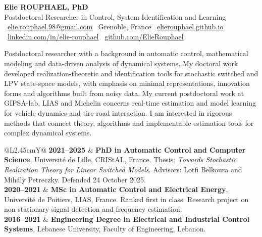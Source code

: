 \documentclass[11pt,a4paper]{article}
\newcommand{\cvsection}[1]{%
  \vspace{0.6em}%
  \noindent{\large\bfseries\color{MainBlue}#1}\par
  \vspace{0.15em}{\color{AccentBlue}\hrule height 1.1pt}%
  \vspace{0.35em}}
\newcommand{\cvitem}[2]{%
  \textbf{\color{MainBlue}#1} & #2\\}
\begin{document}
\begin{tcolorbox}[
  enhanced,
  colback=LightGray,
  colframe=LightGray,
  arc=3pt,
  boxrule=0pt,
  left=12pt,right=12pt,top=10pt,bottom=10pt,
  borderline west={3pt}{0pt}{MainBlue},
]
{\LARGE\bfseries\color{MainBlue} Elie ROUPHAEL, PhD}\\[3pt]
{\normalsize\color{DarkGray} Postdoctoral Researcher in Control, System Identification and Learning}\\[6pt]
{\footnotesize
\textcolor{AccentBlue}{}\ \href{mailto:elie.rouphael.98@gmail.com}{elie.rouphael.98@gmail.com}\quad
\textcolor{AccentBlue}{\textbullet}\ Grenoble, France\quad
\textcolor{AccentBlue}{}\ \href{https://elierouphael.github.io}{elierouphael.github.io}\\[2pt]
\textcolor{AccentBlue}{}\ \href{https://linkedin.com/in/elie-rouphael}{linkedin.com/in/elie-rouphael}\quad
\textcolor{AccentBlue}{}\ \href{https://github.com/ElieRouphael}{github.com/ElieRouphael}
}
\end{tcolorbox}

\cvsection{Research profile}
\justifying
Postdoctoral researcher with a background in automatic control, mathematical modeling and data-driven analysis of dynamical systems. My doctoral work developed realization-theoretic and identification tools for stochastic switched and LPV state-space models, with emphasis on minimal representations, innovation forms and algorithms built from noisy data. My current postdoctoral work at GIPSA-lab, LIAS and Michelin concerns real-time estimation and model learning for vehicle dynamics and tire-road interaction. I am interested in rigorous methods that connect theory, algorithms and implementable estimation tools for complex dynamical systems.

\cvsection{Education}
\begin{tabularx}{\textwidth}{@{}L{2.45cm}Y@{}}
\cvitem{2021--2025}{\textbf{PhD in Automatic Control and Computer Science}, Universit\'e de Lille, CRIStAL, France. Thesis: \textit{Towards Stochastic Realization Theory for Linear Switched Models}. Advisors: Lotfi Belkoura and Mih\'aly Petreczky. Defended 24 October 2025.}
\cvitem{2020--2021}{\textbf{MSc in Automatic Control and Electrical Energy}, Universit\'e de Poitiers, LIAS, France. Ranked first in class. Research project on non-stationary signal detection and frequency estimation.}
\cvitem{2016--2021}{\textbf{Engineering Degree in Electrical and Industrial Control Systems}, Lebanese University, Faculty of Engineering, Lebanon.}
\end{tabularx}
\end{document}
